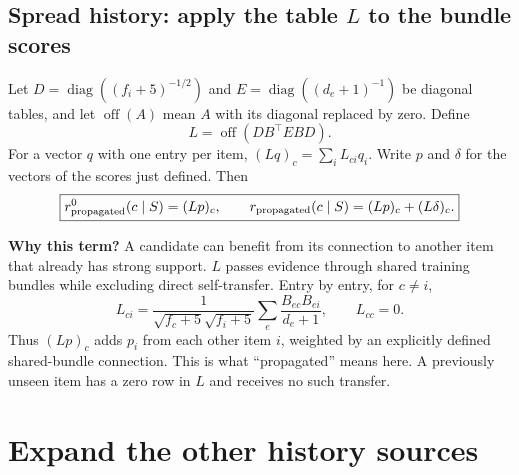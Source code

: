 \documentclass[11pt,a4paper]{article}
\newcommand{\off}{\operatorname{off}}\newcommand{\diag}{\operatorname{diag}}
\newcommand{\why}{\par\textbf{Why this term?} }
\numberwithin{equation}{section}
\begin{document}
\subsection{Spread history: apply the table $L$ to the bundle scores}
Let $D=\diag((f_i+5)^{-1/2})$ and $E=\diag((d_e+1)^{-1})$ be diagonal tables, and let
$\off(A)$ mean $A$ with its diagonal replaced by zero. Define
\begin{equation}\label{L}
 L=\off(DB^\top EBD).
\end{equation}
For a vector $q$ with one entry per item, $(Lq)_c=\sum_i L_{ci}q_i$.
Write $p$ and $\delta$ for the vectors of the scores just defined. Then
\begin{equation}
 \boxed{r_{\rm propagated}^0(c\mid S)=(Lp)_c,\qquad
 r_{\rm propagated}(c\mid S)=(Lp)_c+(L\delta)_c.}
\end{equation}
\why A candidate can benefit from its connection to another item that already has strong
support. $L$ passes evidence through shared training bundles while excluding direct
self-transfer. Entry by entry, for $c\ne i$,
\[
L_{ci}=\frac{1}{\sqrt{f_c+5}\sqrt{f_i+5}}\sum_e\frac{B_{ec}B_{ei}}{d_e+1},\qquad L_{cc}=0.
\]
Thus $(Lp)_c$ adds $p_i$ from each other item $i$, weighted by an explicitly defined
shared-bundle connection. This is what ``propagated'' means here. A previously unseen
item has a zero row in $L$ and receives no such transfer.

\section{Expand the other history sources}
\end{document}
